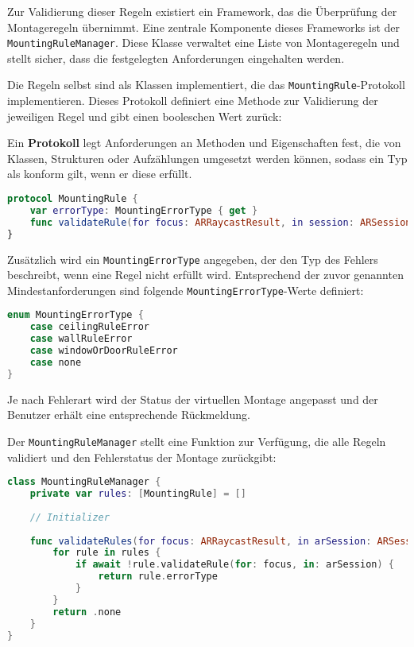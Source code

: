Zur Validierung dieser Regeln existiert ein Framework, das die Überprüfung der Montageregeln übernimmt. Eine zentrale Komponente dieses Frameworks ist der \texttt{MountingRuleManager}. Diese Klasse verwaltet eine Liste von Montageregeln und stellt sicher, dass die festgelegten Anforderungen eingehalten werden.

Die Regeln selbst sind als Klassen implementiert, die das \texttt{MountingRule}-Protokoll implementieren. Dieses Protokoll definiert eine Methode zur Validierung der jeweiligen Regel und gibt einen booleschen Wert zurück:

\begin{tcolorbox}[colback=THAi-Blue!20!white, colframe=THAi-Blue]
    Ein \textbf{Protokoll} legt Anforderungen an Methoden und Eigenschaften fest, die von Klassen, Strukturen oder Aufzählungen umgesetzt werden können, sodass ein Typ als konform gilt, wenn er diese erfüllt. \cite{apple2025swift}
\end{tcolorbox}  

\begin{lstlisting}[language=Swift]
protocol MountingRule {
    var errorType: MountingErrorType { get }
    func validateRule(for focus: ARRaycastResult, in session: ARSession) async -> Bool
}
\end{lstlisting}

Zusätzlich wird ein \texttt{MountingErrorType} angegeben, der den Typ des Fehlers beschreibt, wenn eine Regel nicht erfüllt wird. Entsprechend der zuvor genannten Mindestanforderungen sind folgende \texttt{MountingErrorType}-Werte definiert:

\begin{lstlisting}[language=Swift]
enum MountingErrorType {
    case ceilingRuleError
    case wallRuleError
    case windowOrDoorRuleError
    case none
}
\end{lstlisting}

Je nach Fehlerart wird der Status der virtuellen Montage angepasst und der Benutzer erhält eine entsprechende Rückmeldung.

Der \texttt{MountingRuleManager} stellt eine Funktion zur Verfügung, die alle Regeln validiert und den Fehlerstatus der Montage zurückgibt:


\begin{lstlisting}[language=Swift]
class MountingRuleManager {
    private var rules: [MountingRule] = []
    
    // Initializer
    
    func validateRules(for focus: ARRaycastResult, in arSession: ARSession) async -> errorType: MountingErrorType {
        for rule in rules {
            if await !rule.validateRule(for: focus, in: arSession) {
                return rule.errorType
            }
        }
        return .none
    }
}
\end{lstlisting}

